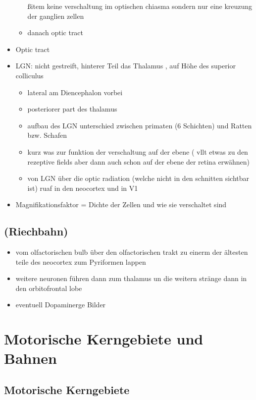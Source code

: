 \documentclass[12pt,a4paper,pdftex]{article}
\begin{document}
\begin{itemize}
\begin{itemize}
        ßitem keine verschaltung im optischen chiasma sondern nur eine kreuzung der ganglien zellen
        \item danach optic tract
    \end{itemize}
    \item Optic tract 
    \item LGN: nicht gestreift, hinterer Teil das Thalamus , auf Höhe des superior colliculus 
    \begin{itemize}
        \item lateral am Diencephalon  vorbei
        \item posteriorer part des thalamus
        \item aufbau des LGN unterschied zwischen primaten (6 Schichten) und Ratten bzw. Schafen
        \item kurz was zur funktion der verschaltung auf der ebene ( vllt etwas zu den rezeptive fields aber dann auch schon auf der ebene der retina erwähnen)
        \item von LGN über die optic radiation (welche nicht in den schnitten sichtbar ist) ruaf in den neocortex und in V1 
    \end{itemize}
    \item Magnifikationsfaktor = Dichte der Zellen und wie sie verschaltet sind
    \\
\end{itemize}
\subsection{(Riechbahn)}
\begin{itemize}
    \item vom olfactorischen bulb über den olfactorischen trakt zu einerm der ältesten teile des neocortex zum Pyriformen lappen
    \item weitere neuronen führen dann zum thalamus un die weitern stränge dann in den orbitofrontal lobe \cite{smith2008biology} 
    \item eventuell Dopaminerge Bilder
\end{itemize}

\newpage
\section{Motorische Kerngebiete und Bahnen}
\subsection{Motorische Kerngebiete}
\end{document}

